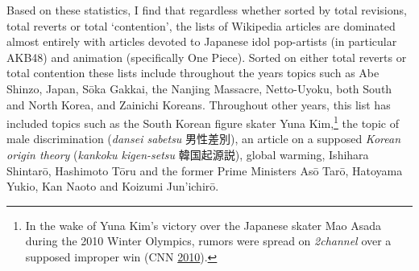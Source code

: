 \documentclass[10pt,british,A4paper,,openany]{memoir}
\begin{document}
\begin{table}[!htb]
\footnotesize
\centering
\setlength{\tabcolsep}{5pt}
\caption{50 most contentious articles on the Japanese Wikipedia (2019)}\label{tab:50mostcont}
\end{table}

Based on these statistics, I find that regardless whether sorted by
total revisions, total reverts or total `contention', the lists of
Wikipedia articles are dominated almost entirely with articles devoted
to Japanese idol pop-artists (in particular AKB48) and animation
(specifically One Piece). Sorted on either total reverts or total
contention these lists include throughout the years topics such as Abe
Shinzo, Japan, Sōka Gakkai, the Nanjing Massacre, Netto-Uyoku, both
South and North Korea, and Zainichi Koreans. Throughout other years,
this list has included topics such as the South Korean figure skater
Yuna Kim,\footnote{In the wake of Yuna Kim's victory over the Japanese
  skater Mao Asada during the 2010 Winter Olympics, rumors were spread
  on \emph{2channel} over a supposed improper win (CNN
  \protect\hyperlink{ref-cnn_korean_2010}{2010}).} the topic of male
discrimination (\emph{dansei sabetsu} 男性差別), an article on a
supposed \emph{Korean origin theory} (\emph{kankoku kigen-setsu}
韓国起源説), global warming, Ishihara Shintarō, Hashimoto Tōru and the
former Prime Ministers Asō Tarō, Hatoyama Yukio, Kan Naoto and Koizumi
Jun'ichirō.
\end{document}
